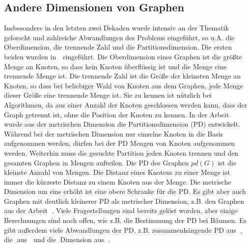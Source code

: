 \subsection{Andere Dimensionen von Graphen}
\vspace{-2mm}
Insbesondere in den letzten zwei Dekaden wurde intensiv an der Thematik geforscht und zahlreiche Abwandlungen des Problems eingeführt, so u.A. die Oberdimension, die trennende Zahl und die Partitionsdimension.\newline
Die ersten beiden wurden in \grqq$\;$\cite{upper} eingeführt. Die Oberdimension eines Graphen ist die größte Menge an Knoten, so dass kein Knoten überflüssig ist und die Menge eine trennende Menge ist. Die trennende Zahl ist die Größe der kleinsten Menge an Knoten, so dass bei beliebiger Wahl von Knoten aus dem Graphen, jede Menge dieser Größe eine trennende Menge ist. Sie zu kennen ist nützlich bei Algorithmen, da aus einer Anzahl der Knoten geschlossen werden kann, dass der Graph getrennt ist, ohne die Position der Knoten zu kennen.
\vspace{-1.5mm}\newline\newline 
In der Arbeit \grqq$\;$\cite{partit} wurde aus der metrischen Dimension die Partitionsdimension (PD) entwickelt. Während bei der metrischen Dimension nur einzelne Knoten in die Basis aufgenommen werden, dürfen bei der PD Mengen von Knoten aufgenommen werden. Weiterhin muss die gesuchte Partition jeden Knoten trennen und den gesamten Graphen in Mengen aufteilen. Die PD des Graphen $pd(G)$ ist die kleinste Anzahl von Mengen. Die Distanz eines Knotens zu einer Menge ist immer die kürzeste Distanz zu einem Knoten aus der Menge.\newline
Die metrische Dimension um eins erhöht ist eine obere Schranke für die PD\cite{partit}. Es gibt aber auch Graphen mit deutlich kleinerer PD als metrischer Dimension, z.B. den Graphen aus der Arbeit \grqq$\;$\cite{disc}. Viele Fragestellungen sind bereits gelöst worden, aber einige Berechnungen sind noch offen, wie z.B. die Bestimmung der PD bei Bäumen. Es gibt außerdem viele Abwandlungen der PD, z.B. zusammenhängende PD aus \grqq$\;$\cite{con}, die \grqq$\;$aus \grqq$\;$\cite{loc} und die \grqq$\;$Dimension aus \grqq$\;$\cite{forcing}.
\vspace{-4mm}
